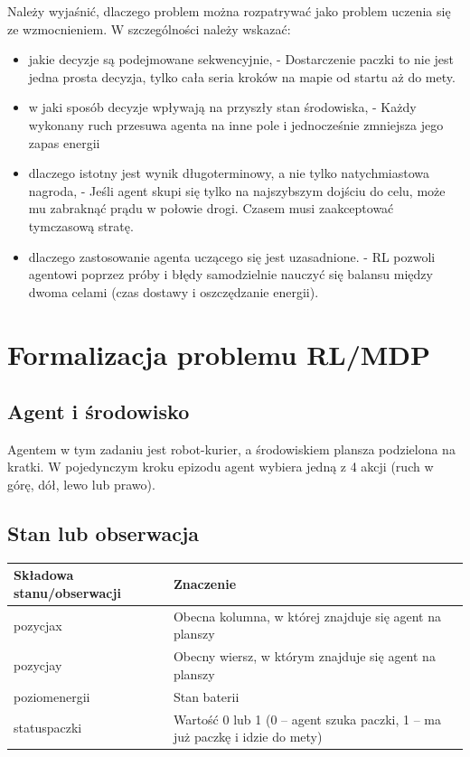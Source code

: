 \documentclass[12pt]{article}
\begin{document}
Należy wyjaśnić, dlaczego problem można rozpatrywać jako problem uczenia się ze wzmocnieniem. W szczególności należy wskazać:
\begin{itemize}
    \item jakie decyzje są podejmowane sekwencyjnie, - Dostarczenie paczki to nie jest jedna prosta decyzja, tylko cała seria kroków na mapie od startu aż do mety.
    \item w jaki sposób decyzje wpływają na przyszły stan środowiska, - Każdy wykonany ruch przesuwa agenta na inne pole i jednocześnie zmniejsza jego zapas energii
    \item dlaczego istotny jest wynik długoterminowy, a nie tylko natychmiastowa nagroda, - Jeśli agent skupi się tylko na najszybszym dojściu do celu, może mu zabraknąć prądu w połowie drogi. Czasem musi zaakceptować tymczasową stratę.
    \item dlaczego zastosowanie agenta uczącego się jest uzasadnione. - RL pozwoli agentowi poprzez próby i błędy samodzielnie nauczyć się balansu między dwoma celami (czas dostawy i oszczędzanie energii).
\end{itemize}

\section{Formalizacja problemu RL/MDP}

\subsection{Agent i środowisko}

Agentem w tym zadaniu jest robot-kurier, a środowiskiem plansza podzielona na kratki. W pojedynczym kroku epizodu agent wybiera jedną z 4 akcji (ruch w górę, dół, lewo lub prawo).

\subsection{Stan lub obserwacja}



\begin{center}
\begin{tabular}{p{}p{}}
\toprule
Składowa stanu/obserwacji & Znaczenie \\
\midrule
pozycjax & Obecna kolumna, w której znajduje się agent na planszy \\
pozycjay & Obecny wiersz, w którym znajduje się agent na planszy \\
poziomenergii & Stan baterii \\
statuspaczki & Wartość 0 lub 1 (0 – agent szuka paczki, 1 – ma już paczkę i idzie do mety) \\
\bottomrule
\end{tabular}
\end{center}
\end{document}
